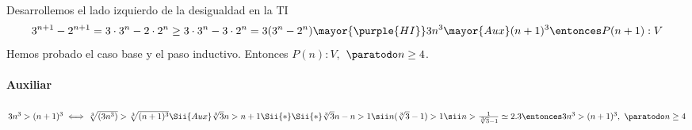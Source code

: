 \begin{enumerate}[label=\roman*)]
        Desarrollemos el lado izquierdo de la desigualdad en la TI
        \begin{align*}
          3^{n+1} - 2^{n+1} = 3 \cdot 3^n - 2 \cdot 2^n \geq 3 \cdot 3^n - 3 \cdot 2^n = 3(3^n - 2^n)
                \mayor{\purple{HI}}
                3n^3
                \mayor{Aux}
                (n+1)^3 \entonces P(n+1):V
        \end{align*}
        Hemos probado el caso base y el paso inductivo. Entonces $P(n):V,$ $\paratodo n \geq 4$.

                \paragraph{Auxiliar}{$3n^3 > (n+1)^3 \iff \sqrt[3]{(3n^3)} > \sqrt[3]{(n+1)^3} \Sii{Aux}
                \sqrt[3]{3}n > n+1 \Sii{*} \\
                \Sii{*} \sqrt[3]{3}n - n > 1 \sii n(\sqrt[3]{3}-1) > 1 \sii n > \frac{1}{\sqrt[3]{3}-1} \simeq 2.3
            \entonces 3n^3 > (n+1)^3, \ \paratodo n \geq 4$}


\end{enumerate}

